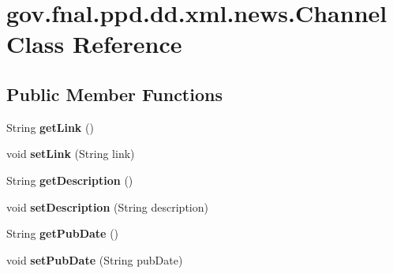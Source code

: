 \hypertarget{classgov_1_1fnal_1_1ppd_1_1dd_1_1xml_1_1news_1_1Channel}{\section{gov.\-fnal.\-ppd.\-dd.\-xml.\-news.\-Channel Class Reference}
\label{classgov_1_1fnal_1_1ppd_1_1dd_1_1xml_1_1news_1_1Channel}
}
\subsection*{Public Member Functions}
\begin{DoxyCompactItemize}
\item 
\hypertarget{classgov_1_1fnal_1_1ppd_1_1dd_1_1xml_1_1news_1_1Channel_a7fdf8c541c2b8db655bef435a3a1256b}{String {\bfseries get\-Link} ()}\label{classgov_1_1fnal_1_1ppd_1_1dd_1_1xml_1_1news_1_1Channel_a7fdf8c541c2b8db655bef435a3a1256b}

\item 
\hypertarget{classgov_1_1fnal_1_1ppd_1_1dd_1_1xml_1_1news_1_1Channel_af109c65ed930f1b2116d2de5dbfb42fe}{void {\bfseries set\-Link} (String link)}\label{classgov_1_1fnal_1_1ppd_1_1dd_1_1xml_1_1news_1_1Channel_af109c65ed930f1b2116d2de5dbfb42fe}

\item 
\hypertarget{classgov_1_1fnal_1_1ppd_1_1dd_1_1xml_1_1news_1_1Channel_ab77d2327090d0d493bedf37c5b591f20}{String {\bfseries get\-Description} ()}\label{classgov_1_1fnal_1_1ppd_1_1dd_1_1xml_1_1news_1_1Channel_ab77d2327090d0d493bedf37c5b591f20}

\item 
\hypertarget{classgov_1_1fnal_1_1ppd_1_1dd_1_1xml_1_1news_1_1Channel_a2ec67eb1b26c0d4454bb132995548bf9}{void {\bfseries set\-Description} (String description)}\label{classgov_1_1fnal_1_1ppd_1_1dd_1_1xml_1_1news_1_1Channel_a2ec67eb1b26c0d4454bb132995548bf9}

\item 
\hypertarget{classgov_1_1fnal_1_1ppd_1_1dd_1_1xml_1_1news_1_1Channel_a9b6e9c2bd616d3317f15277eca7a2f6c}{String {\bfseries get\-Pub\-Date} ()}\label{classgov_1_1fnal_1_1ppd_1_1dd_1_1xml_1_1news_1_1Channel_a9b6e9c2bd616d3317f15277eca7a2f6c}

\item 
\hypertarget{classgov_1_1fnal_1_1ppd_1_1dd_1_1xml_1_1news_1_1Channel_a5865fd17475a128c33c87ac3a8a1fced}{void {\bfseries set\-Pub\-Date} (String pub\-Date)}\label{classgov_1_1fnal_1_1ppd_1_1dd_1_1xml_1_1news_1_1Channel_a5865fd17475a128c33c87ac3a8a1fced}


\end{DoxyCompactItemize}
